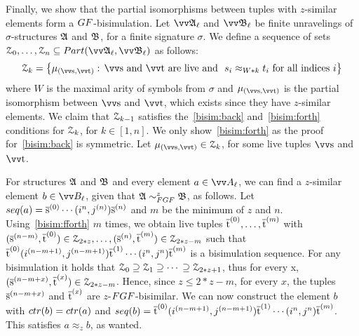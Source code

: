 Finally, we show that the partial isomorphisms between tuples with $z$-similar elements form a $\GF$-bisimulation.
Let $\unravel{A}_{\ell}$ and $\unravel{B}_{\ell}$ be finite unravelings of $\sigma$-structures ${\mathfrak{A}}$ and ${\mathfrak{B}}$, for a finite signature $\sigma$.
We define a sequence of sets $\bisimZ_{0}, \ldots, \bisimZ_{n} \subseteq \PartIso{\unravel{A}_{\ell}}{\unravel{B}_{\ell}}$ as follows:
\begin{equation*}
  \bisimZ_{k} = \left\{
    \mu_{(\elemtuptuples, \elemtuptuplet)}:\,
    \elemtuptuples\ \text{and}\ \elemtuptuplet\ \text{are live and}\ \
    s_{i} \approx_{W * k} t_{i}\ \text{for all indices $i$}
  \right\}
\end{equation*}
where $W$ is the maximal arity of symbols from $\sigma$ and $\mu_{(\elemtuptuples, \elemtuptuplet)}$ is the partial isomorphism between $\elemtuptuples$ and $\elemtuptuplet$, which exists since they have $z$-similar elements.
We claim that $\mathcal{Z}_{k-1}$ satisfies the~\ref{bisim:back} and~\ref{bisim:forth} conditions for $\mathcal{Z}_{k}$, for $k \in [1, n]$.
We only show~\ref{bisim:forth} as the proof for~\ref{bisim:back} is symmetric.
Let $\mu_{(\elemtuptuples, \elemtuptuplet)} \in \bisimZ_{k}$, for some live tuples $\elemtuptuples$ and $\elemtuptuplet$.

For structures ${\mathfrak{A}}$ and ${\mathfrak{B}}$ and every element $a \in \unraveldom{A}_{\ell}$, we can find a $z$-similar element $b \in \unraveldom{B}_{\ell}$, given that $\str{A} \bisimto_{\FGF}^{z} \str{B}$, as follows.
Let $\seq{a} = \elemtuples^{(0)}\cdots(i^{{n}}, j^{(n)})\elemtuples^{(n)}$ and $m$ be the minimum of $z$ and $n$.
Using~\ref{bisim:fforth} $m$ times, we obtain live tuples $\overline{\mathrm{t}}^{(0)}, \ldots, \overline{\mathrm{t}}^{(m)}$ with $(\overline{\mathrm{s}}^{(n-m)}, \overline{\mathrm{t}}^{(0)}) \in \mathcal{Z}_{2*z}, \ldots, (\overline{\mathrm{s}}^{(n)}, \overline{\mathrm{t}}^{(m)}) \in \mathcal{Z}_{2*z - m}$ such that $\overline{\mathrm{t}}^{(0)}(i^{(n-m+1)}, j^{(n-m+1)})\overline{\mathrm{t}}^{(1)}\cdots{}(i^{n}, j^{n})\overline{\mathrm{t}}^{(m)}$ is a bisimulation sequence.
For any bisimulation it holds that $\mathcal{Z}_{0} \supseteq \mathcal{Z}_{1} \supseteq \cdots{} \supseteq \mathcal{Z}_{2*z+1}$, thus for every x, $(\overline{\mathrm{s}}^{(n-m+x)}, \overline{\mathrm{t}}^{(x)}) \in \mathcal{Z}_{2*z - m}$.
Hence, since $z \le 2*z - m$, for every $x$, the tuples $\overline{\mathrm{s}}^{(n-m+x)}$ and $\overline{\mathrm{t}}^{(x)}$ are $z$-$\FGF$-bisimilar.
We can now construct the element $b$ with $\ctr{b} = \ctr{a}$ and $\seq{b} = \elemtuplet^{(0)}(i^{(n-m+1)}, j^{(n-m+1)})\elemtuplet^{(1)}\cdots{}(i^{n}, j^{n})\elemtuplet^{(m)}$.
This satisfies $a \approx_{z} b$, as wanted.
